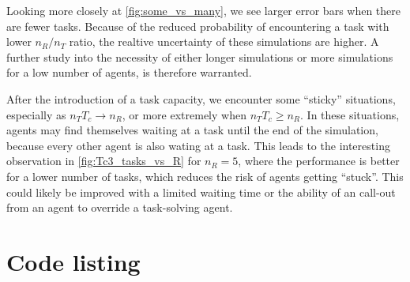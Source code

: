 \documentclass[11pt]{article}
\begin{document}
    Looking more closely at \autoref{fig:some_vs_many}, we see larger error bars 
    when there are fewer tasks.
    Because of the reduced probability of encountering a task with lower $n_R/n_T$
    ratio, the realtive uncertainty of these simulations are higher.
    A further study into the 
    necessity of either longer simulations or more simulations for a low 
    number of agents, is therefore warranted. 

    After the introduction of a task capacity, we encounter some ``sticky'' situations,
    especially as $n_T T_c \to n_R$, or more extremely when $n_T T_c \geq n_R$. In these situations,
    agents may find themselves waiting at a task until the end of the simulation, because 
    every other agent is also wating at a task. This leads to the interesting observation in 
    \autoref{fig:Tc3_tasks_vs_R} for $n_R=5$, where the performance is better for a lower number
    of tasks, which reduces the risk of agents getting ``stuck''. This could likely be improved 
    with a limited waiting time or the ability of an call-out from an agent to override a 
    task-solving agent.

    \printbibliography

    
    \pagebreak

    \appendix
    \section{Code listing}

    
    
\end{document}
